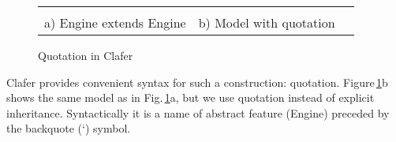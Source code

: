 \documentclass{llncs}
\newcommand{\figref}[1]{Fig.\,\ref{fig:#1}}
\newcommand{\Figref}[1]{Figure\,\ref{fig:#1}}
\begin{document}
\begin{figure}[t]
  \begin{center}
    \begin{tabular}{ccc}
      \begin{minipage}[t]{3.5cm}
        \vspace{0pt}
        
      \end{minipage}
      &
      \begin{minipage}[t]{3.5cm}
        \vspace{0pt}
        
      \end{minipage}\\[0.2cm]
      a) \textsf{Engine} extends \textsf{Engine} & b) Model with quotation
    \end{tabular}
  \end{center}
  \caption{Quotation in Clafer\label{fig:qautofm}}
\end{figure}

Clafer provides convenient syntax for such a construction: quotation. \Figref{qautofm}b shows the same model as in \figref{qautofm}a, but we use quotation instead of explicit inheritance. Syntactically it is a name of abstract feature (\textsf{Engine}) preceded by the backquote (\textsf{`}) symbol.

\nocite{*}


\end{document}
